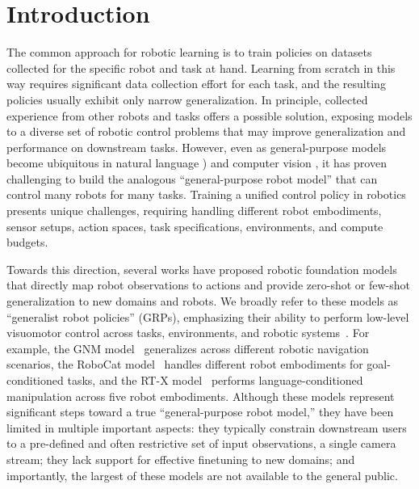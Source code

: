 \section{Introduction}
\label{sec:intro}
\let\thefootnote\relax{}
\setcounter{footnote}{0}
The common approach for robotic learning is to train policies on datasets collected for the specific robot and task at hand. Learning from scratch in this way requires significant data collection effort for each task, and the resulting policies usually exhibit only narrow generalization. In principle, collected experience from other robots and tasks offers a possible solution, exposing models to a diverse set of robotic control problems that may improve generalization and performance on downstream tasks.
However, even as general-purpose models become ubiquitous in natural language \citep{openaiGPT4TechnicalReport2023,touvronLLaMAOpenEfficient2023}) and computer vision \citep{rombachHighResolutionImageSynthesis2022, kirillovSegmentAnything2023}, it has proven challenging to build the analogous ``general-purpose robot model'' that can control many robots for many tasks. Training a unified control policy in robotics presents unique challenges, requiring handling different robot embodiments, sensor setups, action spaces, task specifications, environments, and compute budgets.

Towards this direction, several works have proposed robotic foundation models that directly map robot observations to actions and provide zero-shot or few-shot generalization to new domains and robots.
We broadly refer to these models as ``generalist robot policies'' (GRPs), 
emphasizing their ability to perform low-level visuomotor control across tasks, environments, and robotic systems~\citep{reed2022generalist,bousmalis2023robocat,driess2023palm,zitkovich2023rt,brohan2022rt,shah2023vint,scaleblog,wayveblog,hu2023gaia1,yang2023polybot,kumar2023robohive}. For example, the GNM model~\citep{shahGNMGeneralNavigation2023} generalizes across different robotic navigation scenarios, the RoboCat model~\citep{bousmalis2023robocat} handles different robot embodiments for goal-conditioned tasks, and the RT-X model~\citep{open_x_embodiment_rt_x_2023} performs language-conditioned manipulation across five robot embodiments. 
Although these models represent significant steps toward a true ``general-purpose robot model,'' they have been limited in multiple important aspects: they typically constrain downstream users to a pre-defined and often restrictive set of input observations, \eg a single camera stream; they lack support for effective finetuning to new domains; and importantly, the largest of these models are not available to the general public. 

